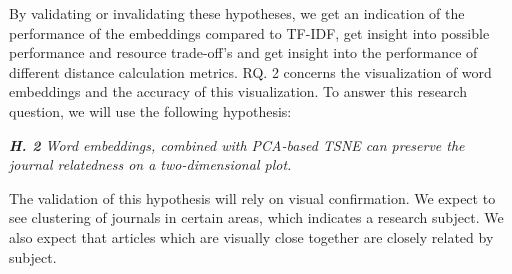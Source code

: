 \documentclass[../../Thesis.tex]{subfiles}
\begin{document}
By validating or invalidating these hypotheses, we get an indication of the performance of the embeddings compared to TF-IDF,  get insight into possible performance and resource trade-off's and get insight into the performance of different distance calculation metrics. 
RQ. 2 concerns the visualization of word embeddings and the accuracy of this visualization. To answer this research question, we will use the following hypothesis:
\begin{jumpin}
\textit{\textbf{H. 2} Word embeddings, combined with PCA-based TSNE can preserve the journal relatedness on a two-dimensional plot.}
\end{jumpin}
The validation of this hypothesis will rely on visual confirmation. We expect to see clustering of journals in certain areas, which indicates a research subject. We also expect that articles which are visually close together are closely related by subject. 
\end{document}

